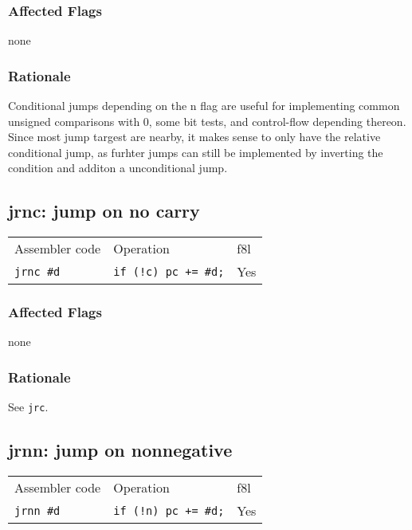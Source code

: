 \documentclass{book}
\begin{document}
\subsubsection*{Affected Flags}

none

\subsubsection*{Rationale}

Conditional jumps depending on the n flag are useful for implementing common unsigned comparisons with 0, some bit tests, and control-flow depending thereon. Since most jump targest are nearby, it makes sense to only have the relative conditional jump, as furhter jumps can still be implemented by inverting the condition and additon a unconditional jump.


\subsection{jrnc: jump on no carry}

\begin{tabular}{l l l}
Assembler code    & Operation                    & f8l \\
\texttt{jrnc \#d} & \texttt{if (!c) pc += \#d;} & Yes \\
\end{tabular}

\subsubsection*{Affected Flags}

none

\subsubsection*{Rationale}

See \texttt{jrc}.


\subsection{jrnn: jump on nonnegative}

\begin{tabular}{l l l}
Assembler code    & Operation                   & f8l \\
\texttt{jrnn \#d} & \texttt{if (!n) pc += \#d;} & Yes \\
\end{tabular}
\end{document}
